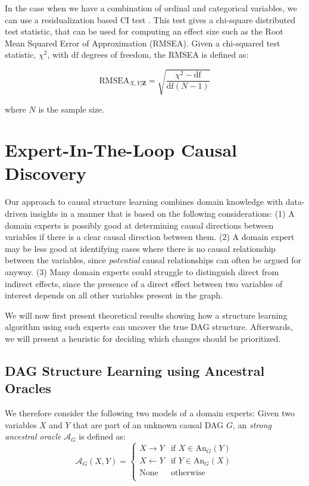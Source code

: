 \documentclass{uai2025} %
\begin{document}
In the case when we have a combination of ordinal and categorical variables, we
can use a residualization based CI test \citep{Ankan2023}. This test gives a
chi-square distributed test statistic, that can be used for computing an effect
size such as the Root Mean Squared Error of Approximation (RMSEA). Given a
chi-squared test statistic, $ \chi^2 $, with $ \textrm{df} $ degrees of
freedom, the RMSEA is defined as:

\begin{equation}
	\textrm{RMSEA}_{X, Y \rvert \bm{Z}} = \sqrt{\frac{\chi^2 - \textrm{df}}{\textrm{df} (N-1)}}
\end{equation}

where $ N $ is the sample size.

\section{Expert-In-The-Loop Causal Discovery}


Our approach to causal structure learning combines domain knowledge with data-driven
insights in a manner that is based on the following considerations: 
(1) A domain experts is possibly good at determining causal directions between variables if 
there is a clear causal direction between them. (2) A domain expert may be less good
at identifying cases where there is no causal relationship between the variables,
since \emph{potential} causal relationships can often be argued for anyway.
(3) Many domain experts could struggle to distinguish direct from indirect 
effects, since the presence of a direct effect between two variables
of interest depends on all other variables present in the graph. 

We will now first present theoretical results showing how a structure
learning algorithm using such experts can uncover the true DAG structure.
Afterwards, we will present a heuristic for deciding which changes should
be prioritized.

\subsection{DAG Structure Learning using Ancestral Oracles}

\label{sec:modification}

We therefore consider the following two models of a domain experts: Given two variables
$ X $ and $ Y $ that are part of an unknown causal DAG $G$, an \emph{strong ancestral oracle} 
$\mathcal{A}_G$ is defined as:
$$\mathcal{A}_G(X,Y)=\begin{cases}
 X \to Y & \textrm{if } X \in \textrm{An}_G(Y) \\
 X \gets Y & \textrm{if } Y \in \textrm{An}_G(X) \\
 \textrm{None} & \textrm{otherwise} \\
\end{cases}$$
\end{document}
